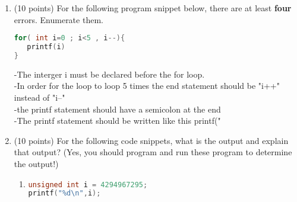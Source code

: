 \documentclass{article}[9pt]
\newenvironment{answerfont}{\fontfamily{qhv}\selectfont}{\par}
\newenvironment{myanswer}{\begin{mdframed}\begin{answerfont}}{\end{answerfont}\end{mdframed}}
\begin{document}
\begin{enumerate}
\begin{enumerate}
\begin{lstlisting}[language=c]
   FILE * gonavy, *beatarmy;

   //WRITE THE REST!

}
\end{lstlisting}

\begin{myanswer}
\begin{lstlisting}[language=c]
#include <stdio.h>
#include <stdlib.h>

int main(int argc, char * argv[]){

   FILE * gonavy, *beatarmy;

   gonavy = fopen("gonavy.txt", "w");
   fprintf(gonavy, "Go Navy\n");
   fclose(gonavy);

   beatarmy = fopen("beatarmy.txt", "w");
   fprintf(beatarmy, "Beat Army\n");
   fclose(beatarmy);

   fprintf(stderr, "Crash Airforce\n");
   return 0;
}
\end{lstlisting}

\end{myanswer}

\item (10 points) For the following program snippet below, there are at least
\textbf{four} errors. Enumerate them.

\begin{lstlisting}[language=c]
for( int i=0 ; i<5 , i--){
   printf(i)
}
\end{lstlisting}

\begin{myanswer}
-The interger i must be declared before the for loop.\\
-In order for the loop to loop 5 times the end statement should be "i++" instead of "i--"\\
-the printf statement should have a semicolon at the end\\
-The printf statement should be written like this printf("%
\end{myanswer}

\item (10 points) For the following code snippets, what is the output and explain
that output? (Yes, you should program and run these program to
determine the output!)

\begin{enumerate}
\item

\begin{lstlisting}[language=c]
unsigned int i = 4294967295;
printf("%d\n",i);
\end{lstlisting}



\end{enumerate}
\end{enumerate}
\end{enumerate}
\end{document}
